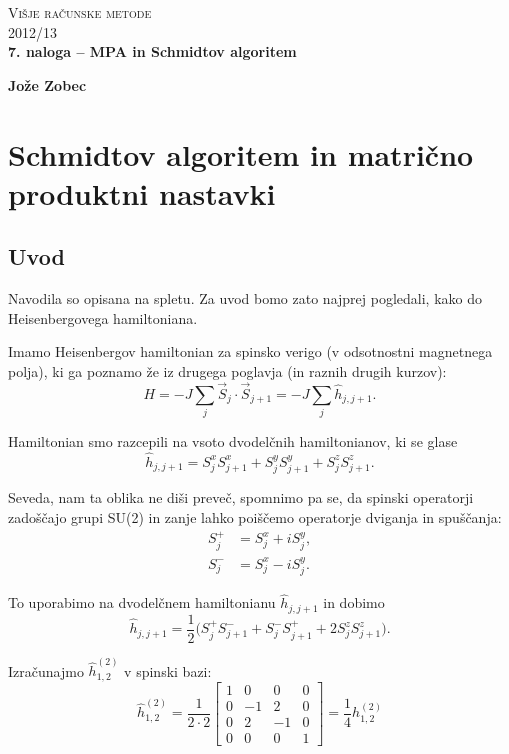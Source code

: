\documentclass[12pt, a4paper]{article}
\begin{document}
\begin{center}
\textsc{Vi\v sje ra\v cunske metode}\\
\textsc{2012/13}\\[0.5cm]
\textbf{7. naloga -- MPA in Schmidtov algoritem}
\end{center}
\begin{flushright}
\textbf{Jo\v ze Zobec}
\end{flushright}

\section{Schmidtov algoritem in matri\v cno produktni nastavki}

\subsection{Uvod}
Navodila so opisana na spletu. Za uvod bomo zato najprej pogledali, kako do Heisenbergovega hamiltoniana.

Imamo Heisenbergov hamiltonian za spinsko verigo (v odsotnostni magnetnega polja), ki ga poznamo že iz
drugega poglavja (in raznih drugih kurzov):
\[
	H = -J\sum_j \vec{S}_j \cdot \vec{S}_{j+1} = -J \sum_j \hat{h}_{j,j+1}.
\]

Hamiltonian smo razcepili na vsoto dvodelčnih hamiltonianov, ki se glase
\[
	\hat{h}_{j,j+1} = S_j^x S_{j+1}^x + S_j^y S_{j+1}^y + S_j^z S_{j+1}^z.
\]

Seveda, nam ta oblika ne diši preveč, spomnimo pa se, da spinski operatorji zadoščajo
grupi SU(2) in zanje lahko poiščemo operatorje dviganja in spuščanja:
\begin{align*}
	S_j^+ &= S_j^x + iS_j^y,\\
	S_j^- &= S_j^x - iS_j^y.
\end{align*}

To uporabimo na dvodelčnem hamiltonianu $\hat{h}_{j,j+1}$ in dobimo
\[
	\hat{h}_{j,j+1} = \frac{1}{2}\big(S^+_jS^-_{j+1} + S^-_jS^+_{j+1} + 2S^z_jS^z_{j+1}\big).
\]

Izračunajmo $\hat{h}^{(2)}_{1,2}$ v spinski bazi:
\[
	\hat{h}^{(2)}_{1,2} = \frac{1}{2 \cdot 2}\begin{bmatrix}
		1 & 0 & 0 & 0 \\
		0 &-1 & 2 & 0 \\
		0 & 2 & -1& 0 \\
		0 & 0 & 0 & 1
	\end{bmatrix} = \frac{1}{4} h^{(2)}_{1,2}
\]
\end{document}
